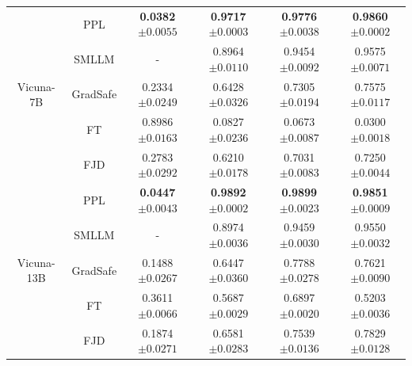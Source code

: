 \documentclass{article}
\begin{document}
\begin{table}[t]
\begin{tabular}{cccccc}
    \midrule
    \multirow{5}{*}{Vicuna-7B} 
    & PPL & \textbf{0.0382}\tiny{$\pm 0.0055$} & \textbf{0.9717}\tiny{$\pm 0.0003$} & \textbf{0.9776}\tiny{$\pm 0.0038$} &\textbf{0.9860}\tiny{$\pm 0.0002$}  \\
    & SMLLM & - & 0.8964\tiny{$\pm 0.0110$} & 0.9454\tiny{$\pm 0.0092$} & 0.9575\tiny{$\pm 0.0071$}    \\
    & GradSafe & 0.2334\tiny{$\pm 0.0249$} & 0.6428\tiny{$\pm 0.0326$} & 0.7305\tiny{$\pm 0.0194$} & 0.7575\tiny{$\pm 0.0117$}   \\
    & FT & 0.8986\tiny{$\pm 0.0163$} & 0.0827\tiny{$\pm 0.0236$} & 0.0673\tiny{$\pm 0.0087$} & 0.0300\tiny{$\pm 0.0018$}   \\
    & FJD & 0.2783\tiny{$\pm 0.0292$} & 0.6210\tiny{$\pm 0.0178$} & 0.7031\tiny{$\pm 0.0083$} & 0.7250\tiny{$\pm 0.0044$}   \\
    \midrule
    \multirow{5}{*}{Vicuna-13B} 
    & PPL & \textbf{0.0447}\tiny{$\pm 0.0043$} & \textbf{0.9892}\tiny{$\pm 0.0002$} & \textbf{0.9899}\tiny{$\pm 0.0023$} & \textbf{0.9851}\tiny{$\pm 0.0009$}  \\
    & SMLLM & - & 0.8974\tiny{$\pm 0.0036$} & 0.9459\tiny{$\pm 0.0030$} & 0.9550\tiny{$\pm 0.0032$}  \\
    & GradSafe & 0.1488\tiny{$\pm 0.0267$} & 0.6447\tiny{$\pm 0.0360$} & 0.7788\tiny{$\pm 0.0278$} & 0.7621\tiny{$\pm 0.0090$}   \\
    & FT & 0.3611\tiny{$\pm 0.0066$} & 0.5687\tiny{$\pm 0.0029$} & 0.6897\tiny{$\pm 0.0020$} & 0.5203\tiny{$\pm 0.0036$}   \\
    & FJD & 0.1874\tiny{$\pm 0.0271$} & 0.6581\tiny{$\pm 0.0283$} & 0.7539\tiny{$\pm 0.0136$} & 0.7829\tiny{$\pm 0.0128$}  \\
    

\end{tabular}
\end{table}
\end{document}
